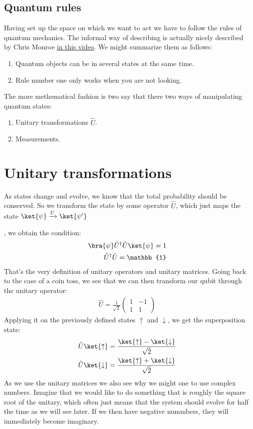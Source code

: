 \subsection{Quantum rules}
Having set up the space on which we want to act we have to follow the rules of quantum mechanics. The informal way of describing is actually nicely described by Chris Monroe \href{https://youtu.be/CC7nlBM2cSM}{in this video}. We might summarize them as follows:
\begin{enumerate}
\item Quantum objects can be in several states at the same time.
\item Rule number one only works when you are not looking.
\end{enumerate}

The more methematical fashion is two say that there two ways of manipulating quantum states:
\begin{enumerate}
\item Unitary transformations $\hat{U}$.
\item Measurements.
\end{enumerate}

\section{Unitary transformations}
As states change and evolve, we know that the total probability should be conserved. So we transform the state by some operator $\hat{U}$, which just maps the state $\ket{\psi}\xrightarrow[]{U}\ket{\psi'}$

, we obtain the condition:
\begin{align}
\bra{\psi}\hat{U}^\dag\hat{U} \ket{\psi} = 1\\
\hat{U}^\dag\hat{U}  = \mathbb{1}
\end{align}
That's the very definition of unitary operators and unitary matrices.
Going back to the case of a coin toss, we see that we can then transform our qubit through the unitary operator:
\begin{align}
\hat{U}=\frac{1}{\sqrt{2}}\left(\begin{array}{cc}
1 & -1\\
1 & 1
\end{array}\right)
\end{align}
Applying it on the previously defined states $\uparrow$ and $\downarrow$, we get the superposition state:
\begin{align}
\hat{U}\ket{\uparrow} &= \frac{\ket{\uparrow}-\ket{\downarrow}}{\sqrt{2}}\\
\hat{U}\ket{\downarrow} &= \frac{\ket{\uparrow}+\ket{\downarrow}}{\sqrt{2}}
\end{align}
As we use the unitary matrices we also see why we might one to use complex numbers. Imagine that we would like to do something that is roughly the square root of the unitary, which often just means that the system should evolve for half the time as we will see later. If we then have negative nummbers, they will immediately become imaginary.

